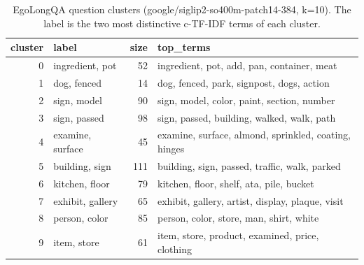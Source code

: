 \begin{table}[t]
\centering
\small
\caption{EgoLongQA question clusters (google/siglip2-so400m-patch14-384, k=10). The label is the two most distinctive c-TF-IDF terms of each cluster.}
\label{tab:clusters_siglip}
\begin{tabular}{rlrl}
\toprule
cluster & label & size & top\_terms \\
\midrule
0 & ingredient, pot & 52 & ingredient, pot, add, pan, container, meat \\
1 & dog, fenced & 14 & dog, fenced, park, signpost, dogs, action \\
2 & sign, model & 90 & sign, model, color, paint, section, number \\
3 & sign, passed & 98 & sign, passed, building, walked, walk, path \\
4 & examine, surface & 45 & examine, surface, almond, sprinkled, coating, hinges \\
5 & building, sign & 111 & building, sign, passed, traffic, walk, parked \\
6 & kitchen, floor & 79 & kitchen, floor, shelf, ata, pile, bucket \\
7 & exhibit, gallery & 65 & exhibit, gallery, artist, display, plaque, visit \\
8 & person, color & 85 & person, color, store, man, shirt, white \\
9 & item, store & 61 & item, store, product, examined, price, clothing \\
\bottomrule
\end{tabular}
\end{table}
